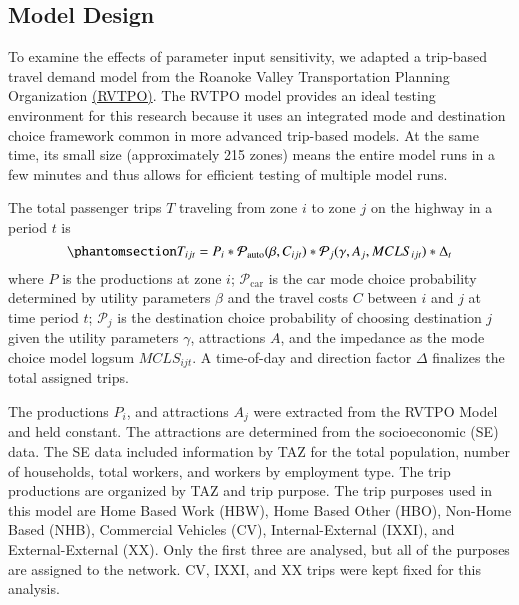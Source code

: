 \documentclass[
  letterpaper,
  number,
  review,
  3p]{elsarticle}
\begin{document}
\subsection{Model Design}\label{model-design}

To examine the effects of parameter input sensitivity, we adapted a
trip-based travel demand model from the Roanoke Valley Transportation
Planning Organization
\href{https://github.com/xinwangvdot/rvtpo}{(RVTPO)}. The RVTPO model
provides an ideal testing environment for this research because it uses
an integrated mode and destination choice framework common in more
advanced trip-based models. At the same time, its small size
(approximately 215 zones) means the entire model runs in a few minutes
and thus allows for efficient testing of multiple model runs.

The total passenger trips \(T\) traveling from zone \(i\) to zone \(j\)
on the highway in a period \(t\) is
\begin{equation}\phantomsection\label{eq-trips}{
T_{ijt} = P_i * \mathcal{P}_{\mathrm{auto}}(\beta, C_{ijt}) * \mathcal{P}_j(\gamma, A_j, MCLS_{ijt}) * \Delta_t 
}\end{equation} where \(P\) is the productions at zone \(i\);
\(\mathcal{P}_{\mathrm{car}}\) is the car mode choice probability
determined by utility parameters \(\beta\) and the travel costs \(C\)
between \(i\) and \(j\) at time period \(t\); \(\mathcal{P}_{j}\) is the
destination choice probability of choosing destination \(j\) given the
utility parameters \(\gamma\), attractions \(A\), and the impedance as
the mode choice model logsum \(MCLS_{ijt}\). A time-of-day and direction
factor \(\Delta\) finalizes the total assigned trips.

The productions \(P_i\), and attractions \(A_j\) were extracted from the
RVTPO Model and held constant. The attractions are determined from the
socioeconomic (SE) data. The SE data included information by TAZ for the
total population, number of households, total workers, and workers by
employment type. The trip productions are organized by TAZ and trip
purpose. The trip purposes used in this model are Home Based Work (HBW),
Home Based Other (HBO), Non-Home Based (NHB), Commercial Vehicles (CV),
Internal-External (IXXI), and External-External (XX). Only the first
three are analysed, but all of the purposes are assigned to the network.
CV, IXXI, and XX trips were kept fixed for this analysis.
\end{document}
